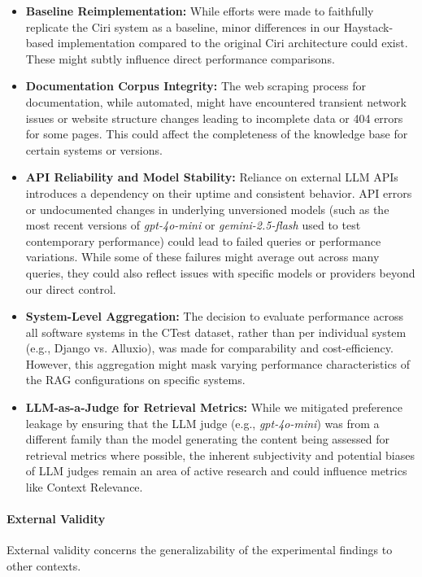 \begin{itemize}
    \item \textbf{Baseline Reimplementation:} While efforts were made to faithfully replicate the Ciri system as a baseline, minor differences in our Haystack-based implementation compared to the original Ciri architecture could exist. These might subtly influence direct performance comparisons.
    \item \textbf{Documentation Corpus Integrity:} The web scraping process for documentation, while automated, might have encountered transient network issues or website structure changes leading to incomplete data or 404 errors for some pages. This could affect the completeness of the knowledge base for certain systems or versions.
    \item \textbf{API Reliability and Model Stability:} Reliance on external LLM APIs introduces a dependency on their uptime and consistent behavior. API errors or undocumented changes in underlying unversioned models (such as the most recent versions of \textit{gpt-4o-mini} or \textit{gemini-2.5-flash} used to test contemporary performance) could lead to failed queries or performance variations. While some of these failures might average out across many queries, they could also reflect issues with specific models or providers beyond our direct control.
    \item \textbf{System-Level Aggregation:} The decision to evaluate performance across all software systems in the CTest dataset, rather than per individual system (e.g., Django vs. Alluxio), was made for comparability and cost-efficiency. However, this aggregation might mask varying performance characteristics of the RAG configurations on specific systems.
    \item \textbf{LLM-as-a-Judge for Retrieval Metrics:} While we mitigated preference leakage by ensuring that the LLM judge (e.g., \textit{gpt-4o-mini}) was from a different family than the model generating the content being assessed for retrieval metrics where possible, the inherent subjectivity and potential biases of LLM judges remain an area of active research and could influence metrics like Context Relevance.
\end{itemize}

\paragraph{External Validity}
External validity concerns the generalizability of the experimental findings to other contexts.

